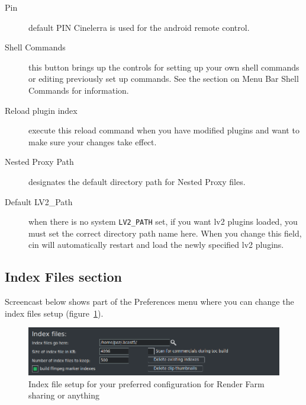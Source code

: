 \begin{description}
    \item[Pin] default PIN Cinelerra is used for the android remote control.
    \item[Shell Commands] this button brings up the controls for setting up your own shell commands or editing previously set up commands.  See the section on Menu Bar Shell Commands for information.
    \item[Reload plugin index] execute this reload command when you have modified plugins and want to make sure your changes take effect.
    \item[Nested Proxy Path] designates the default directory path for Nested Proxy files.
    \item[Default LV2\_Path] when there is no system \texttt{LV2\_PATH} set, if you want lv2 plugins loaded, you must set the correct directory path name here. When you change this field, cin will automatically restart and load the newly specified lv2 plugins.
\end{description}

\subsection{Index Files section}%

\label{sub:index_file_section}
Screencast below shows part of the Preferences menu where you can change the index files setup (figure~\ref{fig:index}).
\begin{figure}[htpb]
    \centering
    \includegraphics[width=0.8\linewidth]{images/index.png}
    \caption{Index file setup for your preferred configuration for Render Farm sharing or anything}
    \label{fig:index}
\end{figure}

